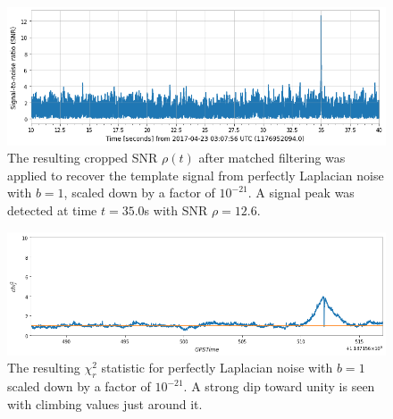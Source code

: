 \documentclass[preprint,
letterpaper,
 amsmath,amssymb,
 aps,
]{revtex4-2}
\begin{document}
\begin{widetext}
\begin{figure}[t]
\includegraphics[width = .9\textwidth]{laplacian b=1 template 1.png}
\caption{The resulting cropped SNR $\rho(t)$ after matched filtering was applied to recover the template signal from perfectly Laplacian noise with $b=1$, scaled down by a factor of $10^{-21}$. A signal peak was detected at time $t = 35.0$s with SNR $\rho = 12.6$.}

\centering
\end{figure} 

\begin{figure}[t]
\includegraphics[width = .9\textwidth]{chi2 laplace b=1 zoomed.png}
\caption{The resulting $\chi^2_r$ statistic for perfectly Laplacian noise with $b=1$ scaled down by a factor of $10^{-21}$. A strong dip toward unity is seen with climbing values just around it.}
\centering
\end{figure} 
\end{widetext}
\end{document}
